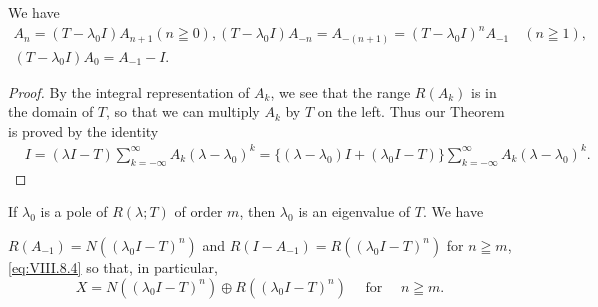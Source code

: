 \begin{theorem}\label{thm:VIII.8.Theorem.2} We have 
\begin{equation}\label{eq:VIII.8.3}
\begin{gathered}
{A _{n} = (T - \lambda_{0} I) A _{n+1} (n \geqq 0),} {(T - \lambda_{0} I) A _{-n} = A _{-(n+1)} = (T - \lambda_{0} I) ^{n} A _{-1} \quad (n \geqq 1),}
\\
{(T - \lambda_{0} I) A _{0} = A _{-1} - I.}
\end{gathered}
\end{equation}
\end{theorem}

\begin{proof}
 By the integral representation of $A_{k}$, we see that the range $R(A_{k})$ is in the domain of $T$, so that we can multiply $A_{k}$ by $T$ on the left. Thus our Theorem is proved by the identity 
\begin{equation}\label{eq:VIII.8.4}
\begin{aligned}
&I = (\lambda I - T) \sum\limits_{k = - \infty} ^{\infty} A _{k} (\lambda - \lambda_{0}) ^{k} = \{(\lambda - \lambda_{0}) I + (\lambda_{0} I - T) \} \sum\limits_{k = - \infty} ^{\infty} A _{k} (\lambda - \lambda_{0}) ^{k}.
\end{aligned}
\end{equation}
\end{proof}

\begin{theorem}\label{thm:VIII.8.Theorem.3} If $\lambda_0$ is a pole of $R(\lambda; T)$ of order $m$, then $\lambda_0$ is an eigenvalue of $T$. We have 

$R(A_{-1}) = N((\lambda_0I - T)^n)$ and $R(I - A_{-1}) = R((\lambda_0I - T)^n)$ for $n \geqq m$, \eqref{eq:VIII.8.4} so that, in particular, 
\begin{equation}\label{eq:VIII.8.5}
X = N ((\lambda_{0} I - T) ^{n}) \oplus R ((\lambda_{0} I - T) ^{n}) \quad \text{ for } \quad n \geqq m.
\end{equation}
\end{theorem}

